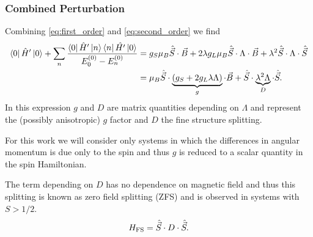 \subsubsection{Combined Perturbation}
Combining \eqref{eq:first_order} and \eqref{eq:second_order} we find 
\begin{equation}
    \begin{align}
    \bra{0} \hat{H}' \ket{0}+  \sum_{n}\frac{\bra{0} \hat{H}' \ket{n} \bra{n} \hat{H'}\ket{0}}{E_0^{(0)} - E_n^{(0)}}
    &= g_S \mu_B \hat{\vec{S}} \cdot \vec{B} + 2\lambda g_L\mu_B\hat{\vec{S}}\cdot\Lambda\cdot\vec{B} + \lambda^2 \hat{\vec{S}}\cdot \Lambda \cdot \hat{\vec{S}} \\ 
    &=\mu_B \hat{\vec{S}} \cdot \underbrace{(g_S + 2g_L \lambda \Lambda)}_{g} \cdot \vec{B} + \hat{\vec{S}}\cdot \underbrace{\lambda^2 \Lambda}_{D} \cdot \hat{\vec{S}}.
    \end{align}
    \label{eq:}
\end{equation}
In this expression $g$ and $D$ are matrix quantities depending on $\Lambda$ and represent the (possibly anisotropic) $g$ factor and $D$ the fine structure splitting. 

{\color{edired}For this work we will consider only systems in which the differences in angular momentum is due only to the spin and thus $g$ is reduced to a scalar quantity in the spin Hamiltonian. 
}

The term depending on $D$ has no dependence on magnetic field and thus this  splitting is known as zero field splitting (ZFS) and is observed in systems with $S > 1/2$. 
\begin{equation}
    H_{\ce{FS}} = \hat{\vec{S}}\cdot D \cdot \hat{\vec{S}}. 
    \label{eq:fine_structure}
\end{equation}







